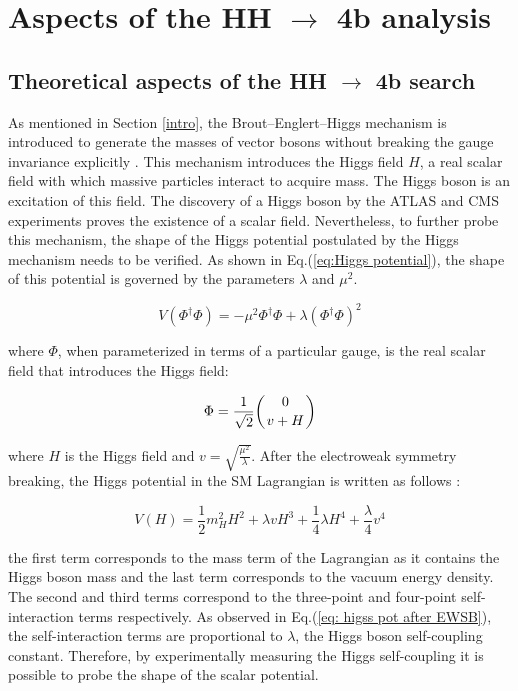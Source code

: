 \section{Aspects of the HH $\to$ 4b analysis} \label{section: HH4b}

\subsection{Theoretical aspects of the HH $\to$ 4b search}

As mentioned in Section \ref{intro}, the Brout–Englert–Higgs mechanism is introduced to generate the masses of vector bosons without breaking the gauge invariance explicitly \cite{Higgs64}. This mechanism introduces the Higgs field $H$, a real scalar field with which massive particles interact to acquire mass. The Higgs boson is an excitation of this field. The discovery of a Higgs boson by the ATLAS \cite{ATLASdecouvhiggs} and CMS \cite{CMShiggsdecouv} experiments proves the existence of a scalar field. Nevertheless, to further probe this mechanism, the shape of the Higgs potential postulated by the Higgs mechanism needs to be verified. As shown in Eq.(\ref{eq:Higgs potential}), the shape of this potential is governed by the parameters $\lambda$ and $\mu^2$.

\begin{equation}
    V(\Phi^\dag \Phi)=-\mu^2 \Phi^\dag \Phi + \lambda (\Phi^\dag \Phi)^2
    \label{eq:Higgs potential}
\end{equation}

\noindent where $\Phi$, when parameterized in terms of a particular gauge, is the real scalar field that introduces the Higgs field:

\begin{equation}
    \Phi= \frac{1}{\sqrt{2}}\bigg( {0 \atop v + H} \bigg)
\end{equation}

\noindent where $H$ is the Higgs field and $v=\sqrt{\frac{\mu^2}{\lambda}}$. After the electroweak symmetry breaking, the Higgs potential in the SM Lagrangian is written as follows \cite{higgs_potential}:

\begin{equation}
    V(H)= \frac{1}{2} m_H^2 H^2 + \lambda v H^3 +\frac{1}{4} \lambda H^4 + \frac{\lambda}{4} v^4
    \label{eq: higss pot after EWSB}
\end{equation}

\noindent the first term corresponds to the mass term of the Lagrangian as it contains the Higgs boson mass and the last term corresponds to the vacuum energy density. The second and third terms correspond to the three-point and four-point self-interaction terms respectively. As observed in Eq.(\ref{eq: higss pot after EWSB}), the self-interaction terms are proportional to $\lambda$, the Higgs boson self-coupling constant. Therefore, by experimentally measuring the Higgs self-coupling it is possible to probe the shape of the scalar potential.

